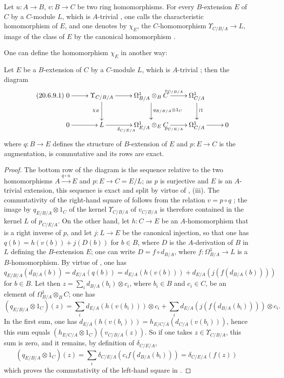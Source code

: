 \begin{definition}[20.6.8]
\label{0.20.6.8}
Let $u:A\to B$, $v:B\to C$ be two ring homomorphisms.
For every $B$-extension $E$ of $C$ by a $C$-module $L$, which is $A$-trivial , one calls the characteristic homomorphism of $E$, and one denotes by $\chi_E$, the $C$-homomorphism $\Upsilon_{C/B/A}\to L$, image of the class of $E$ by the canonical homomorphism .
\end{definition}

One can define the homomorphism $\chi_E$ in another way:
\begin{proposition}[20.6.9]
\label{0.20.6.9}
Let $E$ be a $B$-extension of $C$ by a $C$-module $L$, which is $A$-trivial ; then the diagram
\begin{equation}
\tag{20.6.9.1}
  \label{0.20.6.9.1}
\xymatrix{
  0 \ar[r] & \Upsilon_{C/B/A} \ar[r] \ar[d]_{\chi_E} & \Omega^1_{B/A}\otimes_B C \ar[r]^{v_{C/B/A}} \ar[d]^{q_{E/B/A}\otimes 1_C} & \Omega^1_{C/A} \ar[d]^{\wr 1} \\
  0 \ar[r] & L \ar[r]_{\delta_{C/E/A}} & \Omega^1_{E/A}\otimes_E C \ar[r]_{p_{C/E/A}} & \Omega^1_{C/A} \ar[r] & 0
}
\end{equation}
where $q:B\to E$ defines the structure of $B$-extension of $E$ and $p:E\to C$ is the augmentation, is commutative and its rows are exact.
\end{proposition}

\begin{proof}
The bottom row of the diagram is the sequence  relative to the two homomorphisms $A\xrightarrow{q\circ u}E$ and $p:E\to C=E/L$; as $p$ is surjective and $E$ is an $A$-trivial extension, this sequence is exact and split by virtue of , (iii).
The commutativity of the right-hand square of  follows from the relation $v=p\circ q$ ; the image by $q_{E/B/A}\otimes 1_C$ of the kernel $\Upsilon_{C/B/A}$ of $v_{C/B/A}$ is therefore contained in the kernel $L$ of $p_{C/E/A}$.
On the other hand, let $h:C\to E$ be an $A$-homomorphism that is a right inverse of $p$, and let $j:L\to E$ be the canonical injection, so that one has $q(b)=h(v(b))+j(D(b))$ for $b\in B$, where $D$ is the $A$-derivation of $B$ in $L$ defining the $B$-extension $E$; one can write $D=f\circ d_{B/A}$, where $f:\Omega^1_{B/A}\to L$ is a $B$-homomorphism.
By virtue of , one has $q_{E/B/A}(d_{B/A}(b))=d_{E/A}(q(b))=d_{E/A}(h(v(b)))+d_{E/A}(j(f(d_{B/A}(b))))$ for $b\in B$.
Let then $z=\sum_i d_{B/A}(b_i)\otimes c_i$, where $b_i\in B$ and $c_i\in C$, be an element of $\Omega^1_{B/A}\otimes_B C$; one has
\[
  (q_{E/B/A}\otimes 1_C)(z)=\sum_i d_{E/A}(h(v(b_i)))\otimes c_i+\sum_i d_{E/A}(j(f(d_{B/A}(b_i))))\otimes c_i.
\]
In the first sum, one has $d_{E/A}(h(v(b_i)))=h_{E/C/A}(d_{C/A}(v(b_i)))$, hence this sum equals $(h_{E/C/A}\otimes 1_C)(v_{C/B/A}(z))$.
So if one takes $z\in\Upsilon_{C/B/A}$, this sum is zero, and it remains, by definition of $\delta_{C/E/A}$,
\[
  (q_{E/B/A}\otimes 1_C)(z)=\sum_i\delta_{C/E/A}(c_i f(d_{B/A}(b_i)))=\delta_{C/E/A}(f(z))
\]
which proves the commutativity of the left-hand square in .
\end{proof}


